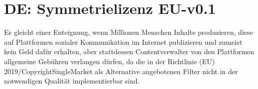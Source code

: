 \documentclass[a4paper,8pt]{extarticle}
\begin{document}

\section{DE: Symmetrielizenz EU-v0.1}
\label{DE}

Es gleicht einer Enteignung, wenn Millionen Menschen Inhalte produzieren, diese auf Plattformen sozialer Kommunikation im Internet publizieren und zumeist kein Geld dafür erhalten, aber stattdessen Contentverwalter von den Plattformen allgemeine Gebühren verlangen dürfen, da die in der Richtlinie (EU) 2019/CopyrightSingleMarket als Alternative angebotenen Filter nicht in der notwendigen Qualität implementierbar sind.
\end{document}
